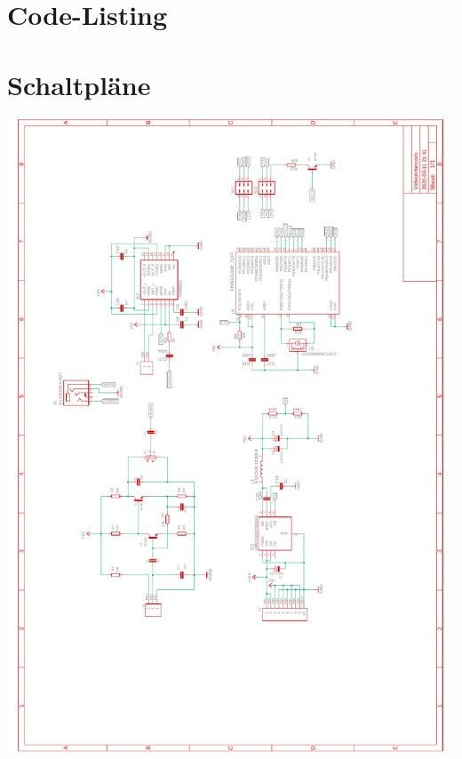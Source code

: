 \section{Code-Listing}


\section{Schaltpläne}
\includegraphics[width=15.5cm]{images/appendix/schematics.pdf}

